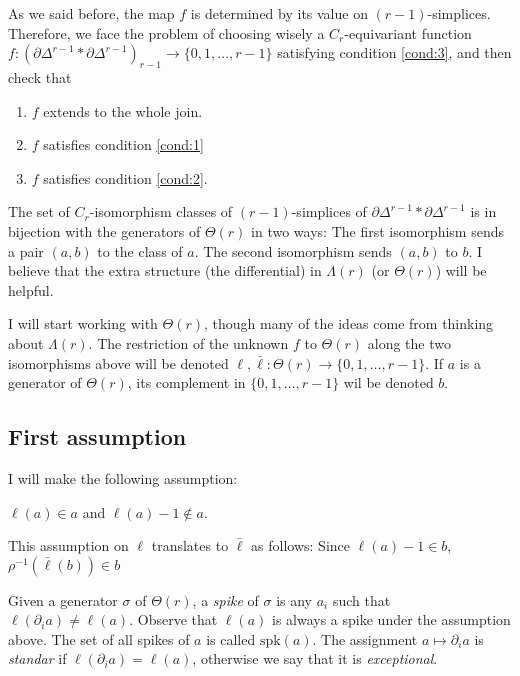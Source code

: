 As we said before, the map $f$ is determined by its value on $(r-1)$-simplices. Therefore, we face the problem of choosing wisely a $C_r$-equivariant function $f\colon (\partial\Delta^{r-1}*\partial\Delta^{r-1})_{r-1}\to \{0,1,\ldots,r-1\}$ satisfying condition \eqref{cond:3}, and then check that
\begin{enumerate}
	\item $f$ extends to the whole join.
	\item $f$ satisfies condition \eqref{cond:1}
	\item $f$ satisfies condition \eqref{cond:2}.
\end{enumerate}
The set of $C_r$-isomorphism classes of $(r-1)$-simplices of $\partial\Delta^{r-1}*\partial\Delta^{r-1}$ is in bijection with the generators of $\Theta(r)$ in two ways: The first isomorphism sends a pair $(a,b)$ to the class of $a$. The second isomorphism sends $(a,b)$ to $b$. I believe that the extra structure (the differential) in $\Lambda(r)$ (or $\Theta(r)$) will be helpful.

I will start working with $\Theta(r)$, though many of the ideas come from thinking about $\Lambda(r)$. The restriction of the unknown $f$ to $\Theta(r)$ along the two isomorphisms above will be denoted $\ell,\bar{\ell}\colon \Theta(r)\to \{0,1,\ldots,r-1\}$. If $a$ is a generator of $\Theta(r)$, its complement in $\{0,1,\ldots,r-1\}$ wil be denoted $b$.

\subsection{First assumption}

I will make the following assumption:
\begin{assumption}
	$\ell(a)\in a$ and $\ell(a)-1\notin a$.
\end{assumption}

\begin{remark}
	This assumption on $\ell$ translates to $\bar{\ell}$ as follows: Since $\ell(a)-1\in b$, $\rho^{-1}(\bar{\ell}(b))\in b$
\end{remark}

\begin{definition}
	Given a generator $\sigma$ of $\Theta(r)$, a \emph{spike} of $\sigma$ is any $a_i$ such that $\ell(\partial_i a) \neq \ell(a)$. Observe that $\ell(a)$ is always a spike under the assumption above. The set of all spikes of $a$ is called $\mathrm{spk}(a)$. The assignment $a\mapsto \partial_i a$ is \emph{standar} if $\ell(\partial_i a) = \ell(a)$, otherwise we say that it is \emph{exceptional}.
\end{definition}

